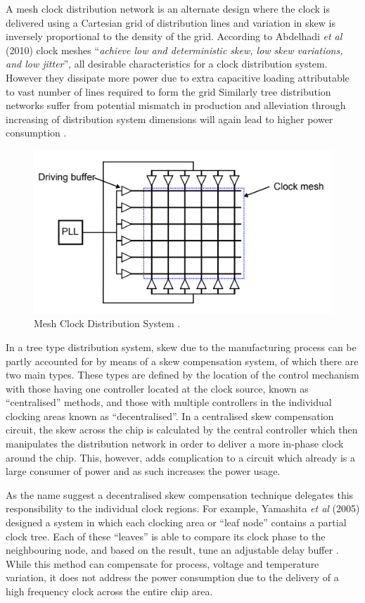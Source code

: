 \documentclass[11pt,english,british]{report}
\begin{document}
A mesh clock distribution network is an alternate design where the clock is delivered using a Cartesian grid of distribution lines and variation in skew is inversely proportional to the density of the grid. According to Abdelhadi \textit{et al} (2010) clock meshes ``\textit{achieve low and deterministic skew, low skew variations, and low jitter}'', all desirable characteristics for a clock distribution system. However they dissipate more power due to extra capacitive loading attributable to vast number of lines required to form the grid Similarly tree distribution networks suffer from potential mismatch in production and alleviation through increasing of distribution system dimensions will again lead to higher power consumption \cite{abdelhadi2010timing}. 
\begin{figure}[h]
	\centering
	\includegraphics[scale=0.6]{eldar_mesh}
	\caption{Mesh Clock Distribution System \cite{zianbetov2013phd}.}
	\label{fig:mesh}
\end{figure}

In a tree type distribution system, skew due to the manufacturing process can be partly accounted for by means of a skew compensation system, of which there are two main types. These types are defined by the location of the control mechanism with those having one controller located at the clock source, known as ``centralised'' methods, and those with multiple controllers in the individual clocking areas known as ``decentralised''. In a centralised skew compensation circuit, the skew across the chip is calculated by the central controller which then manipulates the distribution network in order to deliver a more in-phase clock around the chip. This, however, adds complication to a circuit which already is a large consumer of power and as such increases the power usage.

As the name suggest a decentralised skew compensation technique delegates this responsibility to the individual clock regions. For example, Yamashita \textit{et al} (2005) designed a system in which each clocking area or ``leaf node'' contains a partial clock tree. Each of these ``leaves'' is able to compare its clock phase to the neighbouring node, and based on the result, tune an adjustable delay buffer \cite{yamashita2005dynamic}. While this method can compensate for process, voltage and temperature variation, it does not address the power consumption due to the delivery of a high frequency clock across the entire chip area.
\end{document}
